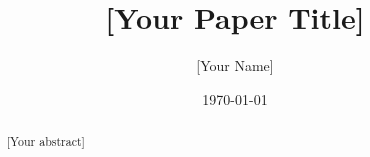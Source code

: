 \documentclass[12pt]{article}
\title{[Your Paper Title]}
\author{[Your Name]\\
        [Your Institution]}
\date{\today}
\begin{document}
\maketitle

\begin{abstract}
[Your abstract]
\end{abstract}








\end{document}

